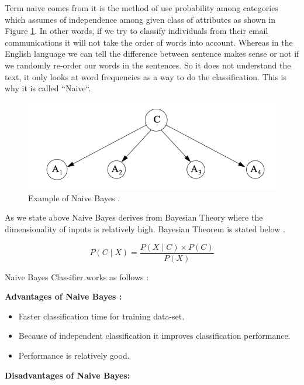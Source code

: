 \documentclass[sigconf]{acmart}
\begin{document}
\par Term naive comes from it is the method of use probability among categories which assumes of independence among given class of attributes as shown in Figure \ref{fig:Naive Bayes}. In other words, if we try to classify individuals from their email communications it will not take the order of words into account. Whereas in the English language we can tell the difference between sentence makes sense or not if we randomly re-order our words in the sentences. So it does not understand the text, it only looks at word frequencies as a way to do the classification. This is why it is called ``Naive``.  

 \begin{figure}[!ht]
    \centering
    \graphicspath{{images/}}
    \includegraphics[width=\columnwidth]{Naive-bayes}
    \caption{Example of Naive Bayes \cite{Zhang}.}\label{fig:Naive Bayes}
\end{figure}


\par As we state above Naive Bayes derives from Bayesian Theory where the dimensionality of inputs is relatively high. Bayesian Theorem is stated below \cite{Sayali}.

\begin{equation}
P(C \mid X) = \frac{P(X \mid C) \times P(C)} {P(X)}
\end{equation}

Naive Bayes Classifier works as follows \cite{Sayali}:

\textbf{Advantages of Naive Bayes \cite{Sayali}:}
\begin{itemize}
\item Faster classification time for training data-set.
\item Because of independent classification it improves classification performance.
\item Performance is relatively good. 
\end{itemize}

\textbf{Disadvantages of Naive Bayes\cite{Sayali}:}
\end{document}
